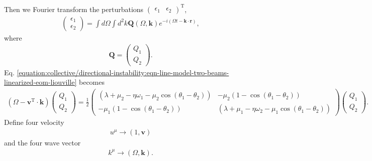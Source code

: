 \documentclass[letterpaper,12pt,english]{sphinxmanual}
\begin{document}
Then we Fourier transform the perturbations \(\begin{pmatrix}\epsilon_1 &  \epsilon_2\end{pmatrix}^{\mathrm T}\),
\begin{equation*}
\begin{split}\begin{pmatrix}
\epsilon_1 \\
\epsilon_2
\end{pmatrix} = \int d\Omega\int d^2 k \mathbf Q(\Omega,\mathbf k) e^{-i(\Omega t- \mathbf k \cdot \mathbf r)},\end{split}
\end{equation*}
where
\begin{equation*}
\begin{split}\mathbf Q = \begin{pmatrix}
Q_1 \\
Q_2
\end{pmatrix}.\end{split}
\end{equation*}
Eq. \eqref{equation:collective/directional-instability:eqn-line-model-two-beams-linearized-eom-liouville} becomes
\begin{equation*}
\begin{split}(\Omega - \mathbf v^{\mathrm T}\cdot \mathbf k)\begin{pmatrix}
Q_1 \\
Q_2
\end{pmatrix} =
\frac{1}{2}\begin{pmatrix}
(\lambda+ \mu_2 - \eta \omega_1 - \mu_2 \cos(\theta_1-\theta_2) ) & -\mu_2 (1-\cos(\theta_1-\theta_2)) \\
-\mu_1 (1- \cos(\theta_1-\theta_2)) & (\lambda + \mu_1 - \eta \omega_2 - \mu_1 \cos(\theta_1-\theta_2) )
\end{pmatrix}\begin{pmatrix}
Q_1 \\
Q_2
\end{pmatrix}.\end{split}
\end{equation*}
Define four velocity
\begin{equation*}
\begin{split}u^\mu\to(1, \mathbf v)\end{split}
\end{equation*}
and the four wave vector
\begin{equation*}
\begin{split}k^\mu\to(\Omega, \mathbf k).\end{split}
\end{equation*}
\end{document}
